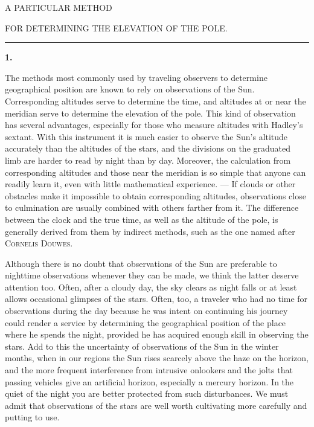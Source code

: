 \renewcommand{\Article}[1]{\par\medskip\Needspace{5\baselineskip}\pdfbookmark[1]{Art. #1}{poli1808-art-#1}\begin{center}\textbf{#1.}\end{center}\nobreak}
\begin{center}\large A PARTICULAR METHOD\par\medskip
FOR DETERMINING THE ELEVATION OF THE POLE.\par\medskip\rule{.09\linewidth}{.3pt}\end{center}
\Article{1}
The methods most commonly used by traveling observers to determine geographical position are known to rely on observations of the Sun. Corresponding altitudes serve to determine the time, and altitudes at or near the meridian serve to determine the elevation of the pole. This kind of observation has several advantages, especially for those who measure altitudes with Hadley’s sextant. With this instrument it is much easier to observe the Sun’s altitude accurately than the altitudes of the stars, and the divisions on the graduated limb are harder to read by night than by day. Moreover, the calculation from corresponding altitudes and those near the meridian is so simple that anyone can readily learn it, even with little mathematical experience. --- If clouds or other obstacles make it impossible to obtain corresponding altitudes, observations close to culmination are usually combined with others farther from it. The difference between the clock and the true time, as well as the altitude of the pole, is generally derived from them by indirect methods, such as the one named after \textsc{Cornelis Douwes}.

Although there is no doubt that observations of the Sun are preferable to nighttime observations whenever they can be made, we think the latter deserve attention too. Often, after a cloudy day, the sky clears as night falls or at least allows occasional glimpses of
the stars. Often, too, a traveler who had no time for observations during the day because he was intent on continuing his journey could render a service by determining the geographical position of the place where he spends the night, provided he has acquired enough skill in observing the stars. Add to this the uncertainty of observations of the Sun in the winter months, when in our regions the Sun rises scarcely above the haze on the horizon, and the more frequent interference from intrusive onlookers and the jolts that passing vehicles give an artificial horizon, especially a mercury horizon. In the quiet of the night you are better protected from such disturbances. We must admit that observations of the stars are well worth cultivating more carefully and putting to use.

